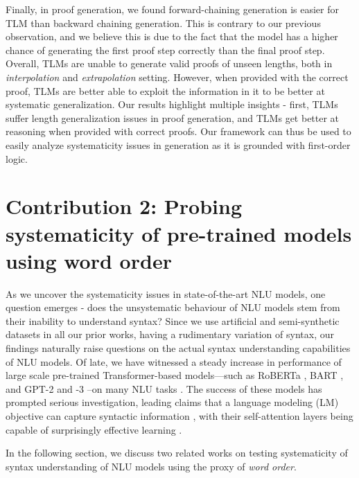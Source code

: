 \documentclass[12pt]{article}
\begin{document}
Finally, in proof generation, we found forward-chaining generation is easier for TLM than backward chaining generation. This is contrary to our previous observation, and we believe this is due to the fact that the model has a higher chance of generating the first proof step correctly than the final proof step. Overall, TLMs are unable to generate valid proofs of unseen lengths, both in \textit{interpolation} and \textit{extrapolation} setting. However, when provided with the correct proof, TLMs are better able to exploit the information in it to be better at systematic generalization. Our results highlight multiple insights - first, TLMs suffer length generalization issues in proof generation, and TLMs get better at reasoning when provided with correct proofs. Our framework can thus be used to easily analyze systematicity issues in generation as it is grounded with first-order logic.

\section{Contribution 2: Probing systematicity of pre-trained models using word order}
\label{sec:cont2}

As we uncover the systematicity issues in state-of-the-art NLU models, one question emerges - does the unsystematic behaviour of NLU models stem from their inability to understand syntax? Since we use artificial and semi-synthetic datasets in all our prior works, having a rudimentary variation of syntax, our  findings naturally raise questions on the actual syntax understanding capabilities of NLU models. Of late, we have witnessed a steady increase in performance of large scale pre-trained Transformer-based \cite{vaswani-etal-2017-attention} models---such as RoBERTa \cite{liu-et-al-2019-roberta}, BART \cite{lewis-etal-2020-bart}, and GPT-2 and -3 \cite{radford-etal-2019-language,brown-etal-2020-gpt3}--on many NLU tasks \cite{wang-etal-2018-glue, wang-etal-2019-superglue}. The success of these models has prompted serious investigation, leading claims that a language modeling (LM) objective can capture syntactic information \cite{hewitt-manning-2019-structural,jawahar-etal-2019-bert, warstadt-bowman-2020-can, wu-etal-2020-perturbed}, with their self-attention layers being capable of surprisingly effective learning \cite{rogers2020}.

In the following section, we discuss two related works \cite{sinha2021,sinha2021a} on testing systematicity of syntax understanding of NLU models using the proxy of \textit{word order}.
\end{document}
